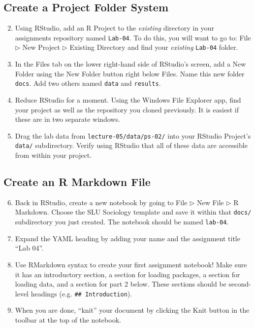 \documentclass{tufte-handout}
\begin{document}
\subsection{Create a Project Folder System}
\begin{enumerate}[label=\alph*.]
\setcounter{enumi}{1}
\item Using RStudio, add an R Project to the \textit{existing} directory in your assignments repository named \texttt{Lab-04}. To do this, you will want to go to: \textsf{File $\triangleright$} {\color{red}\textsf{New Project}} \textsf{$\triangleright$ Existing Directory} and find your \textit{existing} \texttt{Lab-04} folder.
\item In the \textsf{Files} tab on the lower right-hand side of RStudio's screen, add a New Folder using the \textsf{New Folder} button right below \textsf{Files}. Name this new folder \texttt{docs}. Add two others named \texttt{data} and \texttt{results}.
\item Reduce RStudio for a moment. Using the Windows File Explorer app, find your project as well as the repository you cloned previously. It is easiest if these are in two separate windows.
\item Drag the lab data from \texttt{lecture-05/data/ps-02/} into your RStudio Project's \texttt{data/} subdirectory. Verify using RStudio that all of these data are accessible from within your project.
\end{enumerate}

\vspace{3mm}
\subsection{Create an R Markdown File}
\begin{enumerate}[label=\alph*.]
\setcounter{enumi}{5}
\item Back in RStudio, create a new notebook by going to \textsf{File $\triangleright$ New File $\triangleright$} {\color{red}\textsf{R Markdown}}. Choose the SLU Sociology template and save it within that \texttt{docs/} subdirectory you just created. The notebook should be named \texttt{lab-04}.
\item Expand the YAML heading by adding your name and the assignment title ``Lab 04''.
\item Use RMarkdown syntax to create your first assignment notebook! Make sure it has an introductory section, a section for loading packages, a section for loading data, and a section for part 2 below. These sections should be second-level headings (e.g. \texttt{\#\# Introduction}). 
\item When you are done, ``knit'' your document by clicking the \textsf{Knit} button in the toolbar at the top of the notebook.
\end{enumerate}
\end{document}
